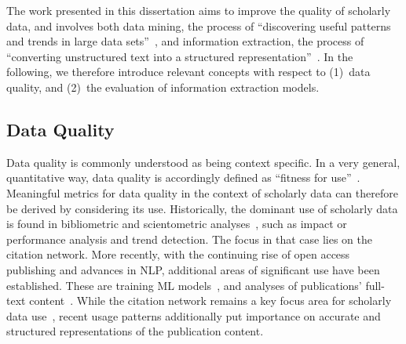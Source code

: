 


The work presented in this dissertation aims to improve the quality of scholarly data, and involves both data mining, the process of ``discovering useful patterns and trends in large data sets''~\cite{Larose2014}, and information extraction, the process of ``converting unstructured text into a structured representation''~\cite{Aggarwal2018}. In the following, we therefore introduce relevant concepts with respect to (1)~data quality, and (2)~the evaluation of information extraction models.

\subsection{Data Quality}

Data quality is commonly understood as being context specific. In a very general, quantitative way, data quality is accordingly defined as ``fitness for use''~\cite{Strong1997,Juran1999}. Meaningful metrics for data quality in the context of scholarly data can therefore be derived by considering its use.
Historically, the dominant use of scholarly data is found in bibliometric and scientometric analyses~\cite{Garfield1964,Mingers2015}, such as impact or performance analysis and trend detection. The focus in that case lies on the citation network. %
More recently, with the continuing rise of open access publishing and advances in NLP, additional areas of significant use have been established. These are training ML models~\cite{Gudivada2017}, and analyses of publications' full-text content~\cite{Jurgens2018,Lahav2022}. While the citation network remains a key focus area for scholarly data use~\cite{Wu2022doceng}, recent usage patterns additionally put importance on accurate and structured representations of the publication content.



